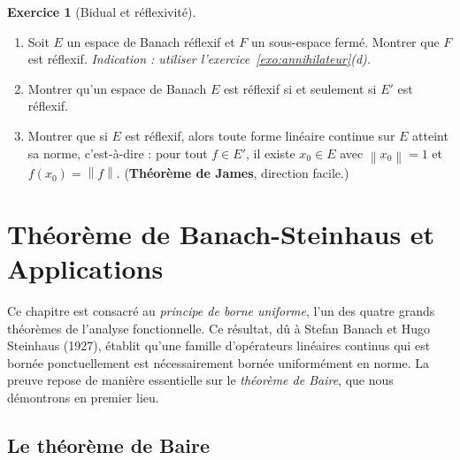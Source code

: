 \documentclass[a4paper,12pt]{book}
\newcommand{\norm}[1]{\left\| #1 \right\|}
\theoremstyle{definition}
\newtheorem{exercice}{Exercice}[chapter]
\theoremstyle{plain}
\theoremstyle{remark}
\begin{document}
\begin{exercice}[Bidual et réflexivité]\label{exo:bidual-reflexivite}
\begin{enumerate}[label=(\alph*)]
    \item Soit $E$ un espace de Banach réflexif et $F$ un sous-espace fermé.
          Montrer que $F$ est réflexif.
          \emph{Indication : utiliser l'exercice~\ref{exo:annihilateur}(d).}
    \item Montrer qu'un espace de Banach $E$ est réflexif si et seulement si $E'$ est
          réflexif.
    \item Montrer que si $E$ est réflexif, alors toute forme linéaire continue sur $E$
          atteint sa norme, c'est-à-dire : pour tout $f \in E'$, il existe $x_0 \in E$
          avec $\norm{x_0} = 1$ et $f(x_0) = \norm{f}$.
          (\textbf{Théorème de James}, direction facile.)
\end{enumerate}
\end{exercice}


\chapter{Théorème de Banach-Steinhaus et Applications}
\label{chap:banach-steinhaus}
\minitoc

\vspace{1em}

Ce chapitre est consacré au \emph{principe de borne uniforme},
l'un des quatre grands théorèmes de l'analyse fonctionnelle. Ce résultat, dû à
Stefan Banach et Hugo Steinhaus (1927),
établit qu'une famille d'opérateurs linéaires continus qui est bornée ponctuellement
est nécessairement bornée uniformément en norme. La preuve repose de manière essentielle
sur le \emph{théorème de Baire}, que nous démontrons en premier lieu.

\section{Le théorème de Baire}
\label{sec:baire}
\end{document}
